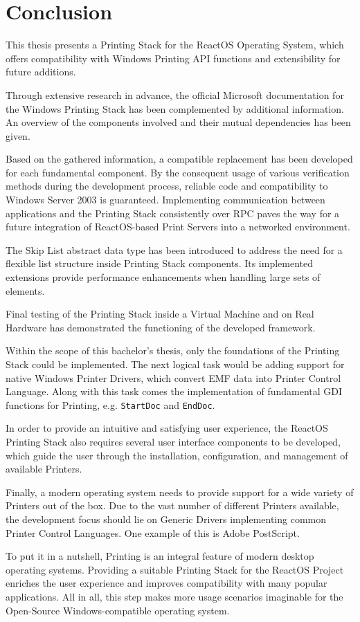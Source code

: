 \chapter{Conclusion}
This thesis presents a Printing Stack for the ReactOS Operating System, which offers compatibility with Windows Printing \gls{API} functions and extensibility for future additions.

Through extensive research in advance, the official Microsoft documentation for the Windows Printing Stack has been complemented by additional information.
An overview of the components involved and their mutual dependencies has been given.

Based on the gathered information, a compatible replacement has been developed for each fundamental component.
By the consequent usage of various verification methods during the development process, reliable code and compatibility to Windows Server 2003 is guaranteed.
Implementing communication between applications and the Printing Stack consistently over \gls{RPC} paves the way for a future integration of ReactOS-based Print Servers into a networked environment.

The Skip List abstract data type has been introduced to address the need for a flexible list structure inside Printing Stack components.
Its implemented extensions provide performance enhancements when handling large sets of elements.

Final testing of the Printing Stack inside a Virtual Machine and on Real Hardware has demonstrated the functioning of the developed framework.

\bigskip

Within the scope of this bachelor's thesis, only the foundations of the Printing Stack could be implemented.
The next logical task would be adding support for native Windows Printer Drivers, which convert \gls{EMF} data into Printer Control Language.
Along with this task comes the implementation of fundamental \gls{GDI} functions for Printing, e.g. \texttt{StartDoc} and \texttt{EndDoc}.

In order to provide an intuitive and satisfying user experience, the ReactOS Printing Stack also requires several user interface components to be developed, which guide the user through the installation, configuration, and management of available Printers.

Finally, a modern operating system needs to provide support for a wide variety of Printers out of the box.
Due to the vast number of different Printers available, the development focus should lie on Generic Drivers implementing common Printer Control Languages.
One example of this is Adobe PostScript.

\bigskip

To put it in a nutshell, Printing is an integral feature of modern desktop operating systems.
Providing a suitable Printing Stack for the ReactOS Project enriches the user experience and improves compatibility with many popular applications.
All in all, this step makes more usage scenarios imaginable for the Open-Source Windows-compatible operating system.
